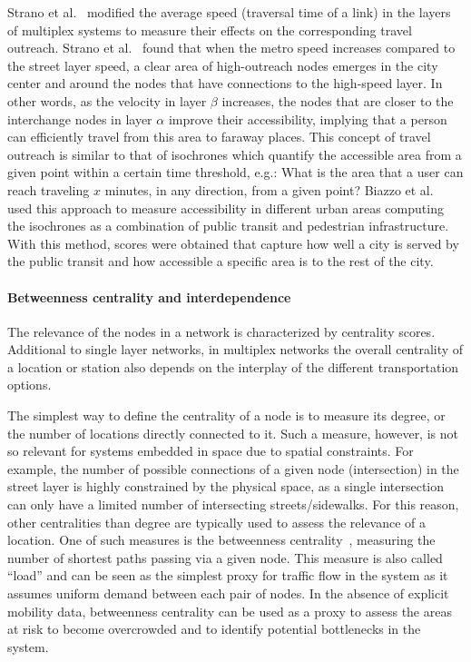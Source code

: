 Strano et al.~\cite{strano2015features} modified the average speed (traversal time of a link) in the layers of multiplex systems to measure their effects on the corresponding travel outreach. Strano et al.~\cite{strano2015features} found that when the metro speed increases compared to the street layer speed, a clear area of high-outreach nodes emerges in the city center and around the nodes that have connections to the high-speed layer. In other words, as the velocity in layer $\beta$ increases, the nodes that are closer to the interchange nodes in layer $\alpha$ improve their accessibility, implying that a person can efficiently travel from this area to faraway places. This concept of travel outreach is similar to that of isochrones which quantify the accessible area from a given point within a certain time threshold, e.g.: What is the area that a user can reach traveling $x$ minutes, in any direction, from a given point? Biazzo et al.~\cite{biazzo2019accesibility} used this approach to measure accessibility in different urban areas computing the isochrones as a combination of public transit and pedestrian infrastructure. With this method, scores were obtained that capture how well a city is served by the public transit and how accessible a specific area is to the rest of the city.


\paragraph*{Betweenness centrality and interdependence}
The relevance of the nodes in a network is characterized by centrality scores. Additional to single layer networks, in multiplex networks the overall centrality of a location or station also depends on the interplay of the different transportation options.

The simplest way to define the centrality of a node is to measure its degree, or the number of locations directly connected to it. Such a measure, however, is not so relevant for systems embedded in space due to spatial constraints. For example, the number of possible connections of a given node (intersection) in the street layer is highly constrained by the physical space, as a single intersection can only have a limited number of intersecting streets/sidewalks. For this reason, other centralities than degree are typically used to assess the relevance of a location. One of such measures is the betweenness centrality~\cite{Freeman1977Centrality}, measuring the number of shortest paths passing via a given node. This measure is also called ``load'' and can be seen as the simplest proxy for traffic flow in the system as it assumes uniform demand between each pair of nodes. In the absence of explicit mobility data, betweenness centrality can be used as a proxy to assess the areas at risk to become overcrowded and to identify potential bottlenecks in the system. 

